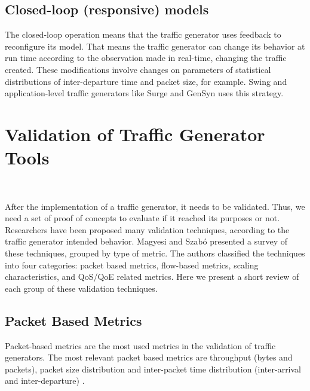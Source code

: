 \subsection{Closed-loop (responsive) models}

The closed-loop operation means that the traffic generator uses feedback to reconfigure its model. That means the traffic generator can change its behavior at run time according to the observation made in real-time, changing the traffic created. These modifications involve changes on parameters of statistical distributions of inter-departure time and packet size, for example. Swing\cite{swing-paper} and application-level traffic generators like Surge\cite{surge-paper} and GenSyn\cite{gensyn-paper} uses this strategy.


\section{Validation of Traffic Generator Tools}~\label{sec:validation-traffic-gen}


After the implementation of a traffic generator, it needs to be validated. Thus, we need a set of proof of concepts to evaluate if it reached its purposes or not. Researchers have been proposed many validation techniques, according to the traffic generator intended behavior. Magyesi and Szabó\cite{validate-trafficgen} presented a survey of these techniques, grouped by type of metric. The authors classified the techniques into four categories: packet based metrics, flow-based metrics, scaling characteristics, and \acrshort{QoS}/\acrshort{QoE} related metrics. Here we present a short review of each group of these validation techniques.


\subsection{Packet Based Metrics}

Packet-based metrics are the most used metrics in the validation of traffic generators\cite{validate-trafficgen}. The most relevant packet based metrics are throughput\cite{do-you-trust}\cite{comparative-trafficgen-tools}\cite{performance-trafficgen}\cite{moongen-paper} (bytes and packets), packet size distribution\cite{packet-distribution-model} and inter-packet time distribution (inter-arrival and inter-departure)\cite{sourcesonoff-paper} \cite{ditg-paper}.


